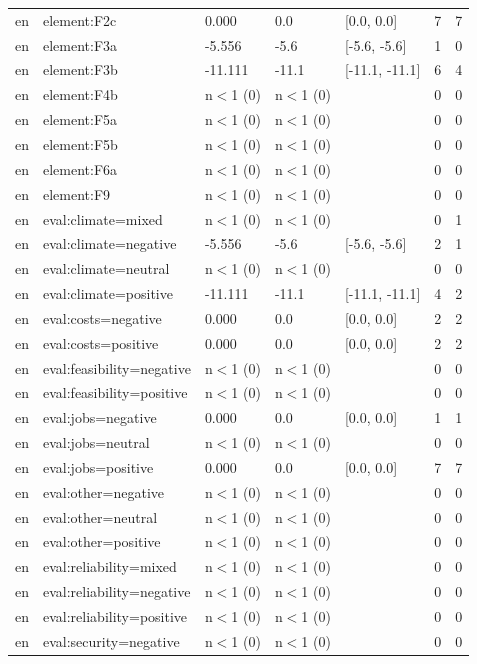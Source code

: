 \begin{table}[htbp]
\begin{tabular}{lllllll}
en & element:F2c & 0.000 & 0.0 & [0.0, 0.0] & 7 & 7 \\
en & element:F3a & -5.556 & -5.6 & [-5.6, -5.6] & 1 & 0 \\
en & element:F3b & -11.111 & -11.1 & [-11.1, -11.1] & 6 & 4 \\
en & element:F4b & n$<$1 (0) & n$<$1 (0) &  & 0 & 0 \\
en & element:F5a & n$<$1 (0) & n$<$1 (0) &  & 0 & 0 \\
en & element:F5b & n$<$1 (0) & n$<$1 (0) &  & 0 & 0 \\
en & element:F6a & n$<$1 (0) & n$<$1 (0) &  & 0 & 0 \\
en & element:F9 & n$<$1 (0) & n$<$1 (0) &  & 0 & 0 \\
en & eval:climate=mixed & n$<$1 (0) & n$<$1 (0) &  & 0 & 1 \\
en & eval:climate=negative & -5.556 & -5.6 & [-5.6, -5.6] & 2 & 1 \\
en & eval:climate=neutral & n$<$1 (0) & n$<$1 (0) &  & 0 & 0 \\
en & eval:climate=positive & -11.111 & -11.1 & [-11.1, -11.1] & 4 & 2 \\
en & eval:costs=negative & 0.000 & 0.0 & [0.0, 0.0] & 2 & 2 \\
en & eval:costs=positive & 0.000 & 0.0 & [0.0, 0.0] & 2 & 2 \\
en & eval:feasibility=negative & n$<$1 (0) & n$<$1 (0) &  & 0 & 0 \\
en & eval:feasibility=positive & n$<$1 (0) & n$<$1 (0) &  & 0 & 0 \\
en & eval:jobs=negative & 0.000 & 0.0 & [0.0, 0.0] & 1 & 1 \\
en & eval:jobs=neutral & n$<$1 (0) & n$<$1 (0) &  & 0 & 0 \\
en & eval:jobs=positive & 0.000 & 0.0 & [0.0, 0.0] & 7 & 7 \\
en & eval:other=negative & n$<$1 (0) & n$<$1 (0) &  & 0 & 0 \\
en & eval:other=neutral & n$<$1 (0) & n$<$1 (0) &  & 0 & 0 \\
en & eval:other=positive & n$<$1 (0) & n$<$1 (0) &  & 0 & 0 \\
en & eval:reliability=mixed & n$<$1 (0) & n$<$1 (0) &  & 0 & 0 \\
en & eval:reliability=negative & n$<$1 (0) & n$<$1 (0) &  & 0 & 0 \\
en & eval:reliability=positive & n$<$1 (0) & n$<$1 (0) &  & 0 & 0 \\
en & eval:security=negative & n$<$1 (0) & n$<$1 (0) &  & 0 & 0 \\

\end{tabular}
\end{table}
